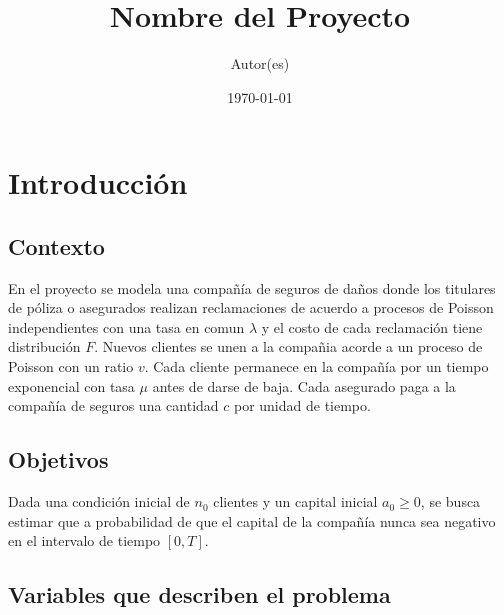 \documentclass[12pt, a4paper]{article}
\title{Nombre del Proyecto}
\author{Autor(es)}
\date{\today}
\begin{document}
\maketitle

\section{Introducción} \label{S1}
\subsection*{Contexto}
En el proyecto se modela una compañía de seguros de daños donde los titulares de póliza o asegurados realizan reclamaciones
de acuerdo a procesos de Poisson independientes con una tasa en comun $\lambda$ y el costo de cada reclamación tiene distribución
$F$. Nuevos clientes se unen a la compañia acorde a un proceso de Poisson con un ratio $v$. Cada cliente permanece en la compañía
por un tiempo exponencial con tasa $\mu$ antes de darse de baja. Cada asegurado paga a la compañía de seguros una cantidad $c$ por 
unidad de tiempo. 

\subsection*{Objetivos}
Dada una condición inicial de $n_0$ clientes y un capital inicial $a_0 \geq 0$, se busca estimar que a probabilidad de que el 
capital de la compañía nunca sea negativo en el intervalo de tiempo $[0, T]$.

\subsection*{Variables que describen el problema}
\end{document}
